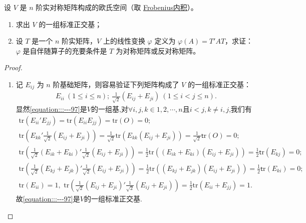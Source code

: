 \documentclass[../../main.tex]{subfiles}%
\begin{document}
\begin{proposition}\label{proposition:例9.30}
设 \(V\) 是 \(n\) 阶实对称矩阵构成的欧氏空间（取 \hyperlink{Frobenius 内积}{Frobenius内积}）。
\begin{enumerate}[(1)]
\item 求出 \(V\) 的一组标准正交基；
\item 设 \(T\) 是一个 \(n\) 阶实矩阵，\(V\) 上的线性变换 \(\varphi\) 定义为 \(\varphi(A)=T'AT\)，求证：\(\varphi\) 是自伴随算子的充要条件是 \(T\) 为对称矩阵或反对称矩阵。
\end{enumerate}
\end{proposition}
\begin{proof}
\begin{enumerate}[(1)]
\item 记 \(E_{ij}\) 为 \(n\) 阶基础矩阵，则容易验证下列矩阵构成了 \(V\) 的一组标准正交基：
\begin{align}\label{equation:::---97}
E_{ii}\ (1\leqslant  i\leqslant  n);\ \frac{1}{\sqrt{2}}(E_{ij}+E_{ji})\ (1\leqslant  i < j\leqslant  n).
\end{align}
显然\eqref{equation:::---97}是$V$的一组基,对$\forall i,j,k\in {1,2,\cdots,n}$且$i<j,k\ne i,j$,我们有
\begin{gather*}
\mathrm{tr}\left( E_{ii}'E_{jj} \right) =\mathrm{tr}\left( E_{ii}E_{jj} \right) =\mathrm{tr}\left( O \right) =0;
\\
\mathrm{tr}\left( E_{kk}'\frac{1}{\sqrt{2}}\left( E_{ij}+E_{ji} \right) \right) =\frac{1}{\sqrt{2}}\mathrm{tr}\left( E_{kk}\left( E_{ij}+E_{ji} \right) \right) =\frac{1}{\sqrt{2}}\mathsf{t}\mathrm{r}\left( O \right) =0;
\\
\mathrm{tr}\left( \frac{1}{\sqrt{2}}\left( E_{ik}+E_{ki} \right) ' \frac{1}{\sqrt{2}}\left( E_{ij}+E_{ji} \right) \right) =\frac{1}{2}\mathrm{tr}\left( \left( E_{ik}+E_{ki} \right) \left( E_{ij}+E_{ji} \right) \right) =\frac{1}{2}\mathsf{t}\mathrm{r}\left( E_{kj} \right) =0;
\\
\mathrm{tr}\left( \frac{1}{\sqrt{2}}\left( E_{kj}+E_{jk} \right) ' \frac{1}{\sqrt{2}}\left( E_{ij}+E_{ji} \right) \right) =\frac{1}{2}\mathrm{tr}\left( \left( E_{kj}+E_{jk} \right) \left( E_{ij}+E_{ji} \right) \right) =\frac{1}{2}\mathsf{t}\mathrm{r}\left( E_{ki} \right) =0;
\\
\mathrm{tr}\left( E_{ii} \right) =1,\,\,\mathrm{tr}\left( \frac{1}{\sqrt{2}}\left( E_{ij}+E_{ji} \right) ' \frac{1}{\sqrt{2}}\left( E_{ij}+E_{ji} \right) \right) =\frac{1}{2}\mathrm{tr}\left( E_{ii}+E_{jj} \right) =1.
\end{gather*}
故\eqref{equation:::---97}是$V$的一组标准正交基.


\end{enumerate}
\end{proof}
\end{document}
